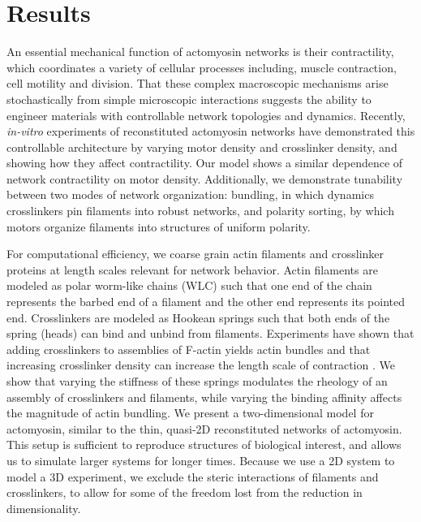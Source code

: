 \documentclass[11pt]{article}
\begin{document}
\section*{Results}
{\color{red}An essential mechanical} function of actomyosin networks is their contractility, which {\color{red}coordinates a variety of cellular processes including}, muscle
contraction, cell motility and division. 
That these complex macroscopic mechanisms arise stochastically from simple microscopic interactions suggests the ability
to engineer materials with controllable network topologies and dynamics. 
Recently, {\it in-vitro} experiments of
reconstituted actomyosin networks have demonstrated this controllable architecture by varying motor density and
crosslinker density, and showing how they affect contractility\cite{murrell2012, murrell2014}. Our model shows a similar dependence of 
{\color{red}network} contractility on motor density. 
Additionally, {\color{red}we demonstrate tunability between} two {\color{red}modes of network} organization: bundling, in which dynamics
crosslinkers pin filaments into robust networks, and polarity sorting, by which motors {\color{red}organize} filaments {\color{red}into structures of uniform} polarity. 
\par
{\color{red}For} computational efficiency, we coarse grain actin filaments and
crosslinker proteins at length scales relevant for network behavior. Actin filaments are
modeled as polar worm-like chains (WLC) such that one end of the chain represents the barbed end of a filament and the
other end represents its pointed end. Crosslinkers are modeled as Hookean springs such
that both ends of the spring (heads) can bind and unbind from filaments. 
Experiments have shown that adding crosslinkers to assemblies of F-actin yields actin bundles \cite{gardel2004, murrell2012, murrell2014}
and that increasing crosslinker density can increase the length scale of contraction \cite{murrell2012}. {\color{red}We} show that 
varying the stiffness of these springs {\color{red}modulates} the rheology 
of an assembly of crosslinkers and filaments, while varying the binding affinity affects the magnitude of actin bundling. We {\color{red}present a two-dimensional} model {\color{red}for actomyosin}, similar to the {\color{red}thin}, quasi-2D reconstituted networks of actomyosin. This setup is sufficient to reproduce structures of biological interest, and allows us to simulate larger systems for longer times. 
Because we use a 2D system to {\color{red}model} a 3D experiment, we exclude the steric interactions of filaments and crosslinkers, to {\color{red}allow} for
some of the freedom lost from the reduction in dimensionality.
\end{document}
